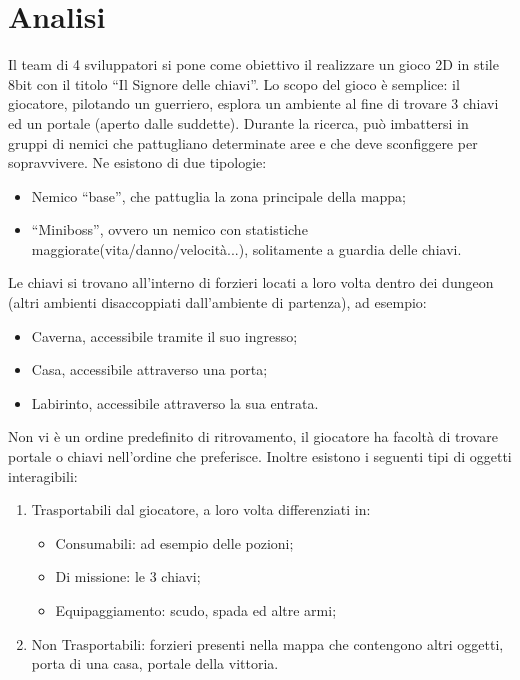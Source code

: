 \documentclass[a4paper, italian, 11pt, oneside]{report}
\begin{document}
\maketitle
\hypersetup{linkcolor=black}
\setcounter{tocdepth}{2}
\tableofcontents
\clearpage

\chapter{Analisi}


Il team di 4 sviluppatori si pone come obiettivo il realizzare un gioco 2D in stile 8bit con il titolo ``Il Signore delle chiavi''. Lo scopo del gioco è semplice: il giocatore, pilotando un guerriero, esplora un ambiente al fine di trovare 3 chiavi ed un portale (aperto dalle suddette). Durante la ricerca, può imbattersi in gruppi di nemici che pattugliano determinate aree e che deve sconfiggere per sopravvivere. Ne esistono di due tipologie: 
\begin{itemize}
  \item Nemico ``base'', che pattuglia la zona principale della mappa;
  \item ``Miniboss'', ovvero un nemico con statistiche maggiorate(vita/danno/velocità...), solitamente a guardia delle chiavi.
\end{itemize}

Le chiavi si trovano all'interno di forzieri locati a loro volta dentro dei dungeon (altri ambienti disaccoppiati dall'ambiente di partenza), ad esempio:
\begin{itemize}
  \item Caverna, accessibile tramite il suo ingresso;
  \item Casa, accessibile attraverso una porta;
  \item Labirinto, accessibile attraverso la sua entrata.
\end{itemize}
Non vi è un ordine predefinito di ritrovamento, il giocatore ha facoltà di trovare portale o chiavi nell'ordine che preferisce. Inoltre esistono i seguenti tipi di oggetti interagibili:
\begin{enumerate}
  \item Trasportabili dal giocatore, a loro volta differenziati in:
  \begin{itemize}
    \item Consumabili: ad esempio delle pozioni; 
    \item Di missione: le 3 chiavi;
    \item Equipaggiamento: scudo, spada ed altre armi;
  \end{itemize}
  \item Non Trasportabili: forzieri presenti nella mappa che contengono altri oggetti, porta di una casa, portale della vittoria.
\end{enumerate}
\end{document}
